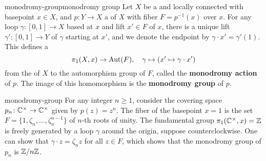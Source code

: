 \begin{topic}{monodromy-group}{monodromy group}
    Let $X$ be a  and locally connected  with basepoint $x \in X$, and $p \colon Y \to X$ a  of $X$ with fiber $F = p^{-1}(x)$ over $x$. For any loop $\gamma \colon [0, 1] \to X$ based at $x$ and lift $x' \in F$ of $x$, there is a unique lift $\gamma' \colon [0, 1] \to Y$ of $\gamma$ starting at $x'$, and we denote the endpoint by $\gamma \cdot x' = \gamma'(1)$. This defines a 
    \[ \pi_1(X, x) \to \textup{Aut}(F), \quad \gamma \mapsto (x' \mapsto \gamma \cdot x') \]
    from the  of $X$ to the automorphism group of $F$, called the \textbf{monodromy action} of $p$. The image of this homomorphism is the \textbf{monodromy group} of $p$.
\end{topic}

\begin{example}{monodromy-group}
    For any integer $n \ge 1$, consider the covering space $p_n \colon \mathbb{C}^\times \to \mathbb{C}^\times$ given by $p(z) = z^n$. The fiber of the basepoint $x = 1$ is the set $F = \{ 1, \zeta_n, \ldots, \zeta_n^{n - 1} \}$ of $n$-th roots of unity. The fundamental group $\pi_1(\mathbb{C}^\times, x) = \mathbb{Z}$ is freely generated by a loop $\gamma$ around the origin, suppose counterclockwise. One can show that $\gamma \cdot z = \zeta_n z$ for all $z \in F$, which shows that the monodromy group of $p_n$ is $\mathbb{Z}/n\mathbb{Z}$.
\end{example}
